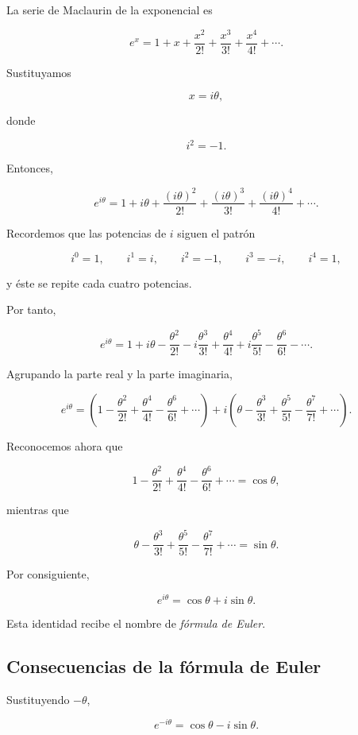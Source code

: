 \documentclass[12pt]{article}
\begin{document}
La serie de Maclaurin de la exponencial es

\[
e^x
=
1+x+\frac{x^2}{2!}
+\frac{x^3}{3!}
+\frac{x^4}{4!}
+\cdots.
\]

Sustituyamos

\[
x=i\theta,
\]

donde

\[
i^2=-1.
\]

Entonces,

\[
e^{i\theta}
=
1+i\theta
+\frac{(i\theta)^2}{2!}
+\frac{(i\theta)^3}{3!}
+\frac{(i\theta)^4}{4!}
+\cdots.
\]

Recordemos que las potencias de \(i\) siguen el patrón

\[
i^0=1,
\qquad
i^1=i,
\qquad
i^2=-1,
\qquad
i^3=-i,
\qquad
i^4=1,
\]

y éste se repite cada cuatro potencias.

Por tanto,

\[
e^{i\theta}
=
1
+i\theta
-\frac{\theta^2}{2!}
-i\frac{\theta^3}{3!}
+\frac{\theta^4}{4!}
+i\frac{\theta^5}{5!}
-\frac{\theta^6}{6!}
-\cdots.
\]

Agrupando la parte real y la parte imaginaria,

\[
e^{i\theta}
=
\left(
1
-\frac{\theta^2}{2!}
+\frac{\theta^4}{4!}
-\frac{\theta^6}{6!}
+\cdots
\right)
+
i
\left(
\theta
-\frac{\theta^3}{3!}
+\frac{\theta^5}{5!}
-\frac{\theta^7}{7!}
+\cdots
\right).
\]

Reconocemos ahora que

\[
1
-\frac{\theta^2}{2!}
+\frac{\theta^4}{4!}
-\frac{\theta^6}{6!}
+\cdots
=
\cos\theta,
\]

mientras que

\[
\theta
-\frac{\theta^3}{3!}
+\frac{\theta^5}{5!}
-\frac{\theta^7}{7!}
+\cdots
=
\sin\theta.
\]

Por consiguiente,

\[
\boxed{
e^{i\theta}
=
\cos\theta+i\sin\theta.
}
\]

Esta identidad recibe el nombre de \emph{fórmula de Euler}.


\subsection{Consecuencias de la fórmula de Euler}

Sustituyendo \(-\theta\),

\[
e^{-i\theta}
=
\cos\theta-i\sin\theta.
\]
\end{document}

